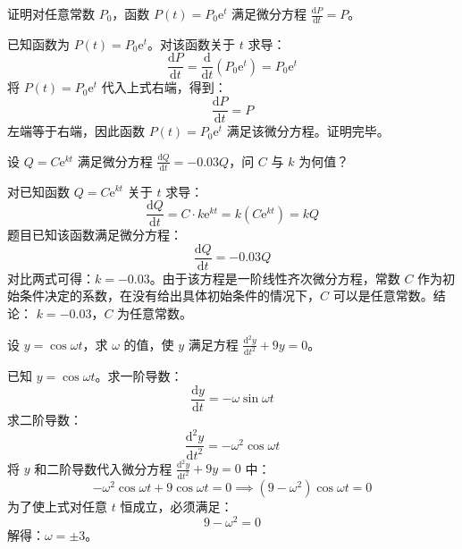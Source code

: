 \documentclass[lang=cn,11pt]{elegantbook}
\begin{document}
\begin{exercise}[验证解]
证明对任意常数 $P_0$，函数 $P(t)=P_0\mathrm{e}^t$ 满足微分方程 $\displaystyle \frac{\mathrm{d}P}{\mathrm{d}t}=P$。
\end{exercise}
\begin{solution}
已知函数为 $P(t)=P_0\mathrm{e}^t$。对该函数关于 $t$ 求导：$$\frac{\mathrm{d}P}{\mathrm{d}t} = \frac{\mathrm{d}}{\mathrm{d}t}(P_0\mathrm{e}^t) = P_0\mathrm{e}^t$$将 $P(t)=P_0\mathrm{e}^t$ 代入上式右端，得到：$$\frac{\mathrm{d}P}{\mathrm{d}t} = P$$左端等于右端，因此函数 $P(t)=P_0\mathrm{e}^t$ 满足该微分方程。证明完毕。
\end{solution}

\begin{exercise}[求参数]
设 $Q=C\mathrm{e}^{kt}$ 满足微分方程 $\displaystyle \frac{\mathrm{d}Q}{\mathrm{d}t}=-0.03Q$，问 $C$ 与 $k$ 为何值？
\end{exercise}
\begin{solution}
对已知函数 $Q=C\mathrm{e}^{kt}$ 关于 $t$ 求导：$$\frac{\mathrm{d}Q}{\mathrm{d}t} = C \cdot k\mathrm{e}^{kt} = k(C\mathrm{e}^{kt}) = kQ$$题目已知该函数满足微分方程：$$\frac{\mathrm{d}Q}{\mathrm{d}t} = -0.03Q$$对比两式可得：$k = -0.03$。由于该方程是一阶线性齐次微分方程，常数 $C$ 作为初始条件决定的系数，在没有给出具体初始条件的情况下，$C$ 可以是任意常数。结论： $k = -0.03$，$C$ 为任意常数。
\end{solution}

\begin{exercise}[求参数]
设 $y=\cos\omega t$，求 $\omega$ 的值，使 $y$ 满足方程 $\displaystyle \frac{\mathrm{d}^2y}{\mathrm{d}t^2}+9y=0$。
\end{exercise}
\begin{solution}
已知 $y=\cos\omega t$。求一阶导数：$$\frac{\mathrm{d}y}{\mathrm{d}t} = -\omega\sin\omega t$$求二阶导数：$$\frac{\mathrm{d}^2y}{\mathrm{d}t^2} = -\omega^2\cos\omega t$$将 $y$ 和二阶导数代入微分方程 $\frac{\mathrm{d}^2y}{\mathrm{d}t^2}+9y=0$ 中：$$-\omega^2\cos\omega t + 9\cos\omega t = 0\implies(9 - \omega^2)\cos\omega t = 0$$为了使上式对任意 $t$ 恒成立，必须满足：$$9 - \omega^2 = 0$$解得：$\omega = \pm 3$。
\end{solution}
\end{document}
